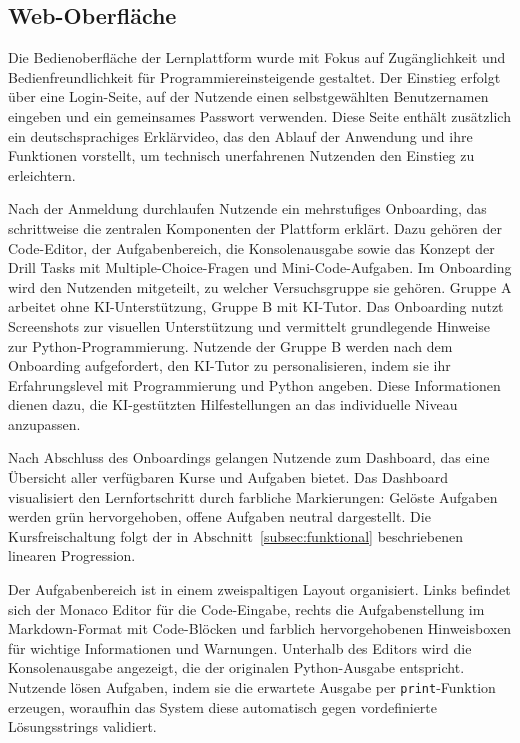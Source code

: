 \subsection{Web-Oberfläche}\label{subsec:webui}

Die Bedienoberfläche der Lernplattform wurde mit Fokus auf Zugänglichkeit und Bedienfreundlichkeit für Programmier\-einsteigende gestaltet.
Der Einstieg erfolgt über eine Login-Seite, auf der Nutzende einen selbstgewählten Benutzernamen eingeben und ein gemeinsames Passwort verwenden.
Diese Seite enthält zusätzlich ein deutschsprachiges Erklärvideo, das den Ablauf der Anwendung und ihre Funktionen vorstellt, um technisch unerfahrenen Nutzenden den Einstieg zu erleichtern.

Nach der Anmeldung durchlaufen Nutzende ein mehrstufiges Onboarding, das schrittweise die zentralen Komponenten der Plattform erklärt.
Dazu gehören der Code-Editor, der Aufgabenbereich, die Konsolenausgabe sowie das Konzept der Drill Tasks mit Multiple-Choice-Fragen und Mini-Code-Aufgaben.
Im Onboarding wird den Nutzenden mitgeteilt, zu welcher Versuchsgruppe sie gehören. Gruppe A arbeitet ohne KI-Unterstützung, Gruppe B mit KI-Tutor.
Das Onboarding nutzt Screenshots zur visuellen Unterstützung und vermittelt grundlegende Hinweise zur Python-Programmierung.
Nutzende der Gruppe B werden nach dem Onboarding aufgefordert, den KI-Tutor zu personalisieren, indem sie ihr Erfahrungslevel mit Programmierung und Python angeben.
Diese Informationen dienen dazu, die KI-gestützten Hilfestellungen an das individuelle Niveau anzupassen.

Nach Abschluss des Onboardings gelangen Nutzende zum Dashboard, das eine Übersicht aller verfügbaren Kurse und Aufgaben bietet.
Das Dashboard visualisiert den Lernfortschritt durch farbliche Markierungen: Gelöste Aufgaben werden grün hervorgehoben, offene Aufgaben neutral dargestellt.
Die Kursfreischaltung folgt der in Abschnitt~\ref{subsec:funktional} beschriebenen linearen Progression.

Der Aufgabenbereich ist in einem zweispaltigen Layout organisiert.
Links befindet sich der Monaco Editor für die Code-Eingabe, rechts die Aufgabenstellung im Markdown-Format \cite{markdown} mit Code-Blöcken und farblich hervorgehobenen Hinweisboxen für wichtige Informationen und Warnungen.
Unterhalb des Editors wird die Konsolenausgabe angezeigt, die der originalen Python-Ausgabe entspricht.
Nutzende lösen Aufgaben, indem sie die erwartete Ausgabe per \texttt{print}-Funktion erzeugen, woraufhin das System diese automatisch gegen vordefinierte Lösungsstrings validiert.

